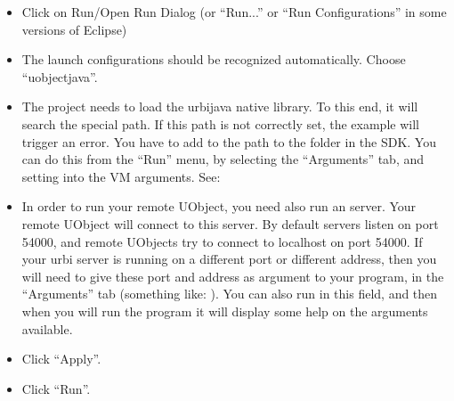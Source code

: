 \begin{itemize}
\item Click on Run/Open Run Dialog (or ``Run...'' or ``Run Configurations''
  in some versions of Eclipse)


\item The launch configurations should be recognized automatically. Choose
  ``uobjectjava''.

\item The project needs to load the urbijava native library. To this end, it
  will search the special  path. If this path is not
  correctly set, the example will trigger an error.  You have to add to
   the path to the  folder in the \urbi
  SDK. You can do this from the ``Run'' menu, by selecting the ``Arguments''
  tab, and setting 
  into the VM arguments. See:


\item In order to run your remote UObject, you need also run an \urbi
  server. Your remote UObject will connect to this \urbi server. By default
  \urbi servers listen on port 54000, and remote UObjects try to connect to
  localhost on port 54000.  If your urbi server is running on a different
  port or different address, then you will need to give these port and
  address as argument to your program, in the ``Arguments'' tab (something
  like: ). You can also run
   in this field, and then when you will run the program it
  will display some help on the arguments available.

\item Click ``Apply''.
\item Click ``Run''.
\end{itemize}

